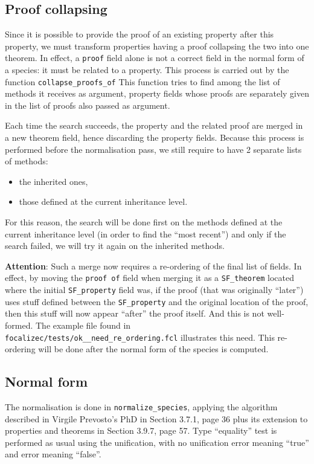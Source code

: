 \subsection{Proof collapsing}
Since it is possible to provide the proof of an existing property
after this property, we must transform properties having a proof
collapsing the two into one theorem. In effect, a {\tt proof} field
alone is not a correct field in the normal form of a species: it must
be related to a property. This process is carried out by the function
{\tt collapse\_proofs\_of} This function tries to find among
the list of methods it receives as argument, property fields whose
proofs are separately given in the list of proofs also passed as
argument.

Each time the search succeeds, the property and the related proof are
merged in a new theorem field, hence discarding the property
fields. Because this process is performed before the normalisation
pass, we still require to have 2 separate lists of methods:
\begin{itemize}
\item the inherited ones,
\item those defined at the current inheritance level.
\end{itemize}

For this reason, the search will be done first on the methods defined at
the current inheritance level (in order to find the ``most recent'') and
only if the search failed, we will try it again on the inherited methods.

{\bf Attention}: Such a merge now requires a re-ordering of the final
list of fields. In effect, by moving the {\tt proof of} field when
merging it as a {\tt SF\_theorem} located where the initial
{\tt SF\_property} field was, if the proof (that was originally
``later'') uses stuff defined between the {\tt SF\_property} and the
original location of the proof, then this stuff will now appear
``after'' the proof itself. And this is not well-formed. The example
file found in \\
{\tt focalizec/tests/ok\_\_need\_re\_ordering.fcl}
illustrates this need. This re-ordering will be done after the normal
form of the species is computed.


\subsection{Normal form}
The normalisation is done in {\tt normalize\_species}, applying the
algorithm described in Virgile Prevosto's PhD in Section 3.7.1, page
36 plus its extension to properties and theorems in Section 3.9.7,
page 57. Type ``equality'' test is performed as usual using the
unification, with no unification error meaning ``true'' and error
meaning ``false''.

